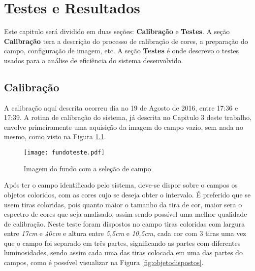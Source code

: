 % 
\chapter{Testes e Resultados} 
Este capitulo será dividido em duas seções: \textbf{Calibração} e \textbf{Testes}. A seção \textbf{Calibração} tera a descrição do processo de calibração de cores, a preparação do campo, configuração de imagem, etc. A seção \textbf{Testes} é onde descrevo o testes usados para a análise de eficiência do sistema desenvolvido.
\section{Calibração}
A calibração aqui descrita ocorreu dia no 19 de Agosto de 2016, entre 17:36 e 17:39.
A rotina de calibração do sistema, já descrita no Capitulo 3 deste trabalho, envolve primeiramente uma aquisição da imagem do campo vazio, sem nada no mesmo, como visto na Figura \ref{campovazio}.
\begin{figure}[H]
		\centering
		\texttt{[image: fundoteste.pdf]}
		\caption{Imagem do fundo com a seleção de campo}
		\label{campovazio}
	\end{figure}
Após ter o campo identificado pelo sistema, deve-se dispor sobre o campos os objetos coloridos, com as cores cujo se deseja obter o intervalo. É preferido que se usem tiras coloridas, pois quanto maior o tamanho da tira de cor, maior sera o espectro de cores que seja analisado, assim sendo possível uma melhor qualidade de calibração.
Neste teste foram dispostos no campo tiras coloridas com largura entre \textit{17cm} e \textit{40cm} e altura entre \textit{5,5cm} e \textit{10,5cm}, cada cor com 3 tiras uma vez que o campo foi separado em três partes, significando as partes com diferentes luminosidades, sendo assim cada uma das tiras colocada em uma das partes do campos, como é possível visualizar na Figura \ref{fig:objetodispostos}.
	
